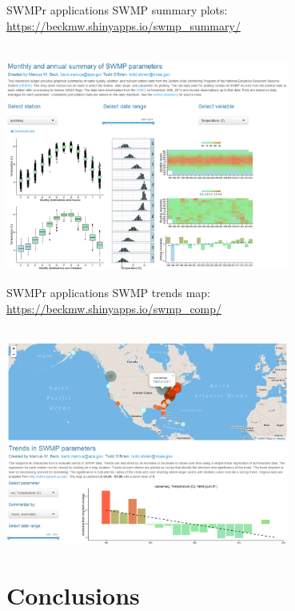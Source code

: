 \documentclass[serif]{beamer}\usepackage[]{graphicx}\usepackage[]{color}
\begin{document}
\begin{frame}[t]{SWMPr applications}
SWMP summary plots: \href{https://beckmw.shinyapps.io/swmp_summary/}{https://beckmw.shinyapps.io/swmp\_summary/}\\~\\
\centerline{\includegraphics[width = 0.7\textwidth]{fig/swmp_summary.png}}
\end{frame}

\begin{frame}[t]{SWMPr applications}
SWMP trends map: \href{https://beckmw.shinyapps.io/swmp_comp/}{https://beckmw.shinyapps.io/swmp\_comp/}\\~\\
\centerline{\includegraphics[width = 0.7\textwidth]{fig/swmp_comp.png}}
\end{frame}

\section{Conclusions}
\end{document}
